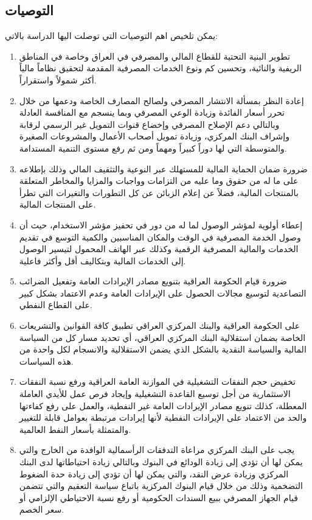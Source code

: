 \documentclass[10pt,a4paper]{report}
\begin{document}
\begin{doublespacing}
\section{التوصيات}
يمكن تلخيص اهم التوصيات التي توصلت اليها الدراسة بالاتي:
\begin{enumerate}
	\item تطوير البنية التحتية للقطاع المالي والمصرفي في العراق وخاصة في المناطق الريفية والنائية، وتحسين كم ونوع الخدمات المصرفية المقدمة لتحقيق نظاماً مالياً أكثر شمولاً واستقراراً.
	\item إعادة النظر بمسألة الانتشار المصرفي ولصالح المصارف الخاصة ودعمها من خلال تحرر أسعار الفائدة وزيادة الوعي المصرفي وبما ينسجم مع المنافسة العادلة وبالتالي دعم الإصلاح المصرفي وإخضاع قنوات التمويل غير الرسمي لرقابة وإشراف البنك المركزي، وزيادة تمويل أصحاب الأعمال والمشروعات الصغيرة والمتوسطة التي لها دوراً كبيراً ومهماً ومن ثم رفع مستوى التنمية المستدامة.
	\item ضرورة ضمان الحماية المالية للمستهلك عبر النوعية والتثقيف المالي وذلك بإطلاعه على ما له من حقوق وما عليه من التزامات وواجبات والمزايا والمخاطر المتعلقة بالمنتجات المالية، فضلاً عن إعلام الزبائن عن كل التطورات والتغيرات التي تطرأ على المنتجات المالية.
	\item إعطاء أولوية لمؤشر الوصول لما له من دور في تحفيز مؤشر الاستخدام، حيث أن وصول الخدمة المصرفية في الوقت والمكان المناسبين والكمية التوسع في تقديم الخدمات والمالية المصرفية الرقمية وكذلك عبر الهاتف المحمول لتيسير الوصول إلى الخدمات المالية وبتكاليف أقل وأكثر فاعلية.
	\item ضرورة قيام الحكومة العراقية بتنويع مصادر الإيرادات العامة وتفعيل الضرائب التصاعدية لتوسيع مجالات الحصول على الإيرادات العامة وعدم الاعتماد بشكل كبير على القطاع النفطي.
	\item على الحكومة العراقية والبنك المركزي العراقي تطبيق كافة القوانين والتشريعات الخاصة بضمان استقلالية البنك المركزي العراقي، أي تحديد مسار كل من السياسة المالية والسياسة النقدية بالشكل الذي يضمن الاستقلالية والانسجام لكل واحدة من هذه السياسات.
	\item تخفيض حجم النفقات التشغيلية في الموازنة العامة العراقية ورفع نسبة النفقات الاستثمارية من أجل توسيع القاعدة التشغيلية وإيجاد فرص عمل للأيدي العاملة المعطلة، كذلك تنويع مصادر الإيرادات العامة غير النفطية، والعمل على رفع كفاءتها والحد من الاعتماد على الإيرادات النفطية لأنها إيرادات مرتبطة بعوامل قابلة للتغيير والمتمثلة بأسعار النفط العالمية.
	\item يجب على البنك المركزي مراعاة التدفقات الرأسمالية الوافدة من الخارج والتي يمكن لها أن تؤدي إلى زيادة الودائع في البنوك وبالتالي زيادة احتياطاتها لدى البنك المركزي وزيادة عرض النقد، والتي يمكن لها أن تؤدي إلى زيادة حدة الضغوط التضخمية وذلك من خلال قيام البنوك المركزية باتباع سياسة التعقيم  والتي تتضمن قيام الجهاز المصرفي ببيع السندات الحكومية أو رفع نسبة الاحتياطي الإلزامي أو سعر الخصم.

\end{enumerate}
\end{doublespacing}
\end{document}
